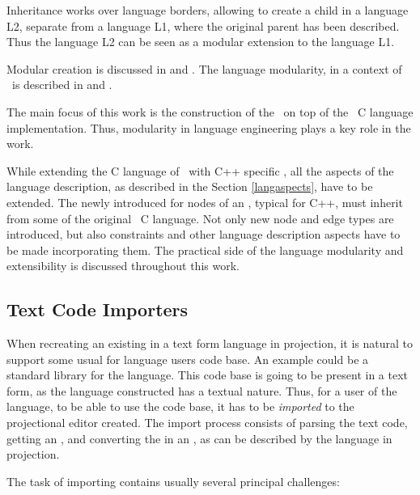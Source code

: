 
Inheritance works over language borders, allowing to create a child 
in a language L2, separate from a language L1, where the original parent  has been described. Thus the language L2 can be seen as a modular extension to the
language L1. 

Modular  creation is discussed in \cite{1998_hudak_modular_dsl_and_tools} and \cite{2006_wyk_modular_dsl_extensions}. 
The language modularity, in a context of \jbmps\ is described in \cite{2012_ratiu_modular_dsls_and_analyses} and \cite{Voelter2011}.

The main focus of this work is the construction of the \cpppl\ on top of the \mbdr\ C language implementation. 
Thus, modularity in language engineering plays a key role in the work.

While extending the C language of \mbdr\ with C++ specific , all the aspects of the language description,
as described in the Section \ref{langaspects}, have
to be extended. The newly introduced  for nodes of an , typical for C++, must inherit from some  of the original 
\mbp\ C language. Not only new node and edge types are introduced, but also constraints and other language description aspects have to be made 
incorporating them. The practical side of the language modularity and extensibility is discussed throughout this work.


\subsection{Text Code Importers}
\label{importers}

When recreating an existing in a text form language in projection, it is natural to support some usual for language users code base. 
An example could be a standard library for the language. This code base is going to be present in a text form, as the language constructed
has a textual nature. Thus, for a user of the language, to be able to use the code base, it has to be \emph{imported} to 
the projectional editor created.
The import process consists of parsing the text code, getting an , and converting the  in an , as can
be described by the language in projection.

The task of importing contains usually several principal challenges:

